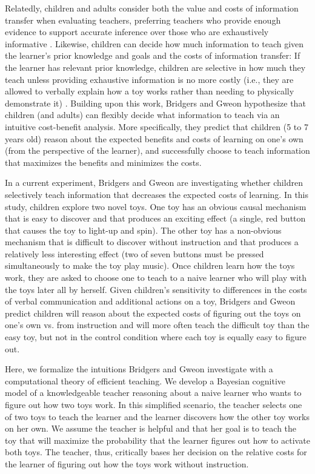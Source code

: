 \documentclass[10pt,letterpaper]{article}
\begin{document}
Relatedly, children and adults consider both the value and costs of information transfer when evaluating teachers, preferring teachers who provide enough evidence to support accurate inference over those who are exhaustively informative \cite{GweonReview, Shafto2012}. Likewise, children can decide how much information to teach given the learner's prior knowledge and goals and the costs of information transfer: If the learner has relevant prior knowledge, children are selective in how much they teach unless providing exhaustive information is no more costly (i.e., they are allowed to verbally explain how a toy works rather than needing to physically demonstrate it)  \cite{GweonSchulz2014}. Building upon this work, Bridgers and Gweon hypothesize that children (and adults) can flexibly decide what information to teach via an intuitive cost-benefit analysis. More specifically, they predict that children (5 to 7 years old) reason about the expected benefits and costs of learning on one's own (from the perspective of the learner), and successfully choose to teach information that maximizes the benefits and minimizes the costs. 

In a current experiment, Bridgers and Gweon are investigating whether children selectively teach information that decreases the expected costs of learning. In this study, children explore two novel toys. One toy has an obvious causal mechanism that is easy to discover and that produces an exciting effect (a single, red button that causes the toy to light-up and spin). The other toy has a non-obvious mechanism that is difficult to discover without instruction and that produces a relatively less interesting effect (two of seven buttons must be pressed simultaneously to make the toy play music). Once children learn how the toys work, they are asked to choose one to teach to a naive learner who will play with the toys later all by herself. Given children's sensitivity to differences in the costs of verbal communication and additional actions on a toy, Bridgers and Gweon predict children will reason about the expected costs of figuring out the toys on one's own vs. from instruction and will more often teach the difficult toy than the easy toy, but not in the control condition where each toy is equally easy to figure out.

Here, we formalize the intuitions Bridgers and Gweon investigate with a computational theory of efficient teaching. We develop a Bayesian cognitive model of a knowledgeable teacher reasoning about a naive learner who wants to figure out how two toys work. In this simplified scenario, the teacher selects one of two toys to teach the learner and the learner discovers how the other toy works on her own. We assume the teacher is helpful and that her goal is to teach the toy that will maximize the probability that the learner figures out how to activate both toys. The teacher, thus, critically bases her decision on the relative costs for the learner of figuring out how the toys work without instruction. 
\end{document}
